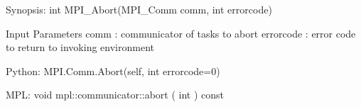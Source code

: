Synopsis:
int MPI_Abort(MPI_Comm comm, int errorcode)

Input Parameters
comm : communicator of tasks to abort
errorcode : error code to return to invoking environment

Python:
MPI.Comm.Abort(self, int errorcode=0)

MPL:
void mpl::communicator::abort ( int ) const
